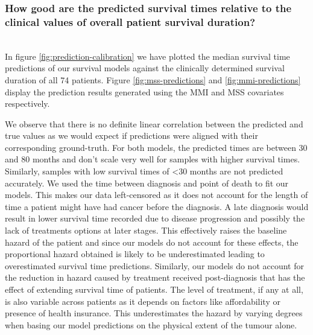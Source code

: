 \documentclass{l4proj}
\begin{document}
\subsubsection{How good are the predicted survival times relative to the clinical values of overall patient survival duration?}\hfill \\
In figure \ref{fig:prediction-calibration} we have plotted the median survival time predictions of our survival models against the clinically determined survival duration of all 74 patients. Figure \ref{fig:mss-predictions} and \ref{fig:mmi-predictions} display the prediction results generated using the MMI and MSS covariates respectively. 

We observe that there is no definite linear correlation between the predicted and true values as we would expect if predictions were aligned with their corresponding ground-truth. For both models, the predicted times are between 30 and 80 months and don't scale very well for samples with higher survival times. Similarly, samples with low survival times of <30 months are not predicted accurately. We used the time between diagnosis and point of death to fit our models. This makes our data left-censored as it does not account for the length of time a patient might have had cancer before the diagnosis. A late diagnosis would result in lower survival time recorded due to disease progression and possibly the lack of treatments options at later stages. This effectively raises the baseline hazard of the patient and since our models do not account for these effects, the proportional hazard obtained is likely to be underestimated leading to overestimated survival time predictions. Similarly, our models do not account for the reduction in hazard caused by treatment received post-diagnosis that has the effect of extending  survival time of patients. The level of treatment, if any at all, is also variable across patients as it depends on factors like affordability or presence of health insurance. This underestimates the hazard by varying degrees when basing our model predictions on the physical extent of the tumour alone. 
\end{document}
